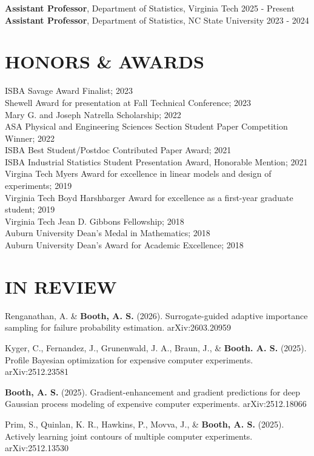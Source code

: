 \documentclass[margin,line,11pt]{res}
\begin{document}
\begin{resume}
{\bf Assistant Professor}, Department of Statistics, {\sc Virginia Tech} \hfill 2025 - Present \\
{\bf Assistant Professor}, Department of Statistics, {\sc NC State University} \hfill 2023 - 2024

\bigskip
\section{\bf HONORS \& AWARDS}

ISBA Savage Award Finalist; 2023 \\
Shewell Award for presentation at Fall Technical Conference; 2023 \\
Mary G. and Joseph Natrella Scholarship; 2022 \\
ASA Physical and Engineering Sciences Section Student Paper Competition Winner; 2022 \\
ISBA Best Student/Postdoc Contributed Paper Award; 2021 \\
ISBA Industrial Statistics Student Presentation Award, Honorable Mention; 2021 \\
Virgina Tech Myers Award for excellence in linear models and design of experiments; 2019 \\
Virginia Tech Boyd Harshbarger Award for excellence as a first-year graduate student; 2019 \\
Virginia Tech Jean D. Gibbons Fellowship; 2018 \\
Auburn University Dean's Medal in Mathematics; 2018 \\
Auburn University Dean's Award for Academic Excellence; 2018

\medskip
\section{\bf{IN REVIEW}}

Renganathan, A. \& {\bf Booth, A. S.} (2026). Surrogate-guided adaptive importance sampling for failure probability estimation. arXiv:2603.20959

Kyger, C., Fernandez, J., Grunenwald, J. A., Braun, J., \& {\bf Booth. A. S.} (2025). Profile Bayesian optimization for expensive computer experiments. arXiv:2512.23581

{\bf Booth, A. S.} (2025). Gradient-enhancement and gradient predictions for deep Gaussian process modeling of expensive computer experiments. arXiv:2512.18066

Prim, S., Quinlan, K. R., Hawkins, P., Movva, J., \& {\bf Booth, A. S.} (2025). Actively learning joint contours of multiple computer experiments. arXiv:2512.13530


\end{resume}
\end{document}
